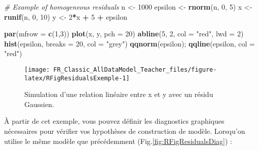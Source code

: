 \documentclass[french,a4paper]{article}
\newenvironment{Shaded}{\begin{snugshade}}{\end{snugshade}}
\newcommand{\CommentTok}[1]{\textcolor[rgb]{0.56,0.35,0.01}{\textit{#1}}}
\newcommand{\DataTypeTok}[1]{\textcolor[rgb]{0.13,0.29,0.53}{#1}}
\newcommand{\DecValTok}[1]{\textcolor[rgb]{0.00,0.00,0.81}{#1}}
\newcommand{\KeywordTok}[1]{\textcolor[rgb]{0.13,0.29,0.53}{\textbf{#1}}}
\newcommand{\NormalTok}[1]{#1}
\newcommand{\OperatorTok}[1]{\textcolor[rgb]{0.81,0.36,0.00}{\textbf{#1}}}
\newcommand{\StringTok}[1]{\textcolor[rgb]{0.31,0.60,0.02}{#1}}
\begin{document}
\begin{Shaded}
\begin{Highlighting}[]
\CommentTok{# Example of homogeneous residuals}
\NormalTok{n <-}\StringTok{ }\DecValTok{1000}
\NormalTok{epsilon <-}\StringTok{ }\KeywordTok{rnorm}\NormalTok{(n, }\DecValTok{0}\NormalTok{, }\DecValTok{5}\NormalTok{)}
\NormalTok{x <-}\StringTok{ }\KeywordTok{runif}\NormalTok{(n, }\DecValTok{0}\NormalTok{, }\DecValTok{10}\NormalTok{)}
\NormalTok{y <-}\StringTok{ }\DecValTok{2}\OperatorTok{*}\NormalTok{x }\OperatorTok{+}\StringTok{ }\DecValTok{5} \OperatorTok{+}\StringTok{ }\NormalTok{epsilon}

\KeywordTok{par}\NormalTok{(}\DataTypeTok{mfrow =} \KeywordTok{c}\NormalTok{(}\DecValTok{1}\NormalTok{,}\DecValTok{3}\NormalTok{))}
\KeywordTok{plot}\NormalTok{(x, y, }\DataTypeTok{pch =} \DecValTok{20}\NormalTok{)}
\KeywordTok{abline}\NormalTok{(}\DecValTok{5}\NormalTok{, }\DecValTok{2}\NormalTok{, }\DataTypeTok{col =} \StringTok{"red"}\NormalTok{, }\DataTypeTok{lwd =} \DecValTok{2}\NormalTok{)}
\KeywordTok{hist}\NormalTok{(epsilon, }\DataTypeTok{breaks =} \DecValTok{20}\NormalTok{, }\DataTypeTok{col =} \StringTok{"grey"}\NormalTok{)}
\KeywordTok{qqnorm}\NormalTok{(epsilon); }\KeywordTok{qqline}\NormalTok{(epsilon, }\DataTypeTok{col =} \StringTok{"red"}\NormalTok{)}
\end{Highlighting}
\end{Shaded}

\begin{figure}[!h]

{\centering \texttt{[image: FR\_Classic\_AllDataModel\_Teacher\_files/figure-latex/RFigResidualsExemple-1]} 

}

\caption{Simulation d'une relation linéaire entre x et y avec un résidu Gaussien.}\label{fig:RFigResidualsExemple}
\end{figure}

À partir de cet exemple, vous pouvez définir les diagnostics graphiques nécessaires pour vérifier vos hypothèses de construction de modèle. Lorsqu'on utilise le même modèle que précédemment (Fig.\ref{fig:RFigResidualsDiag}) :
\end{document}
